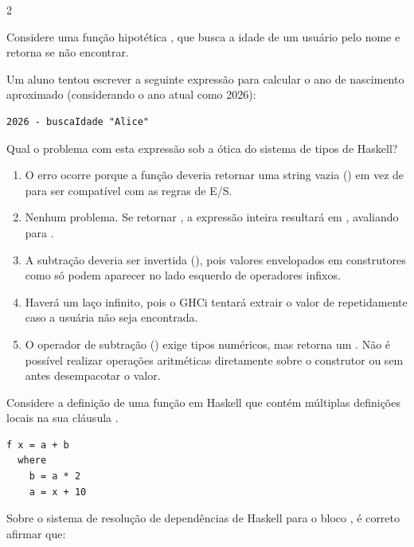 \documentclass[a4paper,10pt,brazil]{article}
\begin{document}
\begin{multicols}{2}
\begin{enumerate}
\end{enumerate}

Considere uma função hipotética , que busca a idade de um usuário pelo nome e retorna  se não encontrar. 

Um aluno tentou escrever a seguinte expressão para calcular o ano de nascimento aproximado (considerando o ano atual como 2026):
\begin{verbatim}
2026 - buscaIdade "Alice"
\end{verbatim}

Qual o problema com esta expressão sob a ótica do sistema de tipos de Haskell?

\begin{enumerate}
  \item O erro ocorre porque a função  deveria retornar uma string vazia () em vez de  para ser compatível com as regras de E/S.

  \item Nenhum problema. Se  retornar , a expressão inteira resultará em , avaliando para .

  \item A subtração deveria ser invertida (), pois valores envelopados em construtores como  só podem aparecer no lado esquerdo de operadores infixos.

  \item Haverá um laço infinito, pois o GHCi tentará extrair o valor de  repetidamente caso a usuária não seja encontrada.

  \item O operador de subtração (\haskellinline{-}) exige tipos numéricos, mas  retorna um . Não é possível realizar operações aritméticas diretamente sobre o construtor  ou  sem antes desempacotar o valor.


\end{enumerate}

Considere a definição de uma função  em Haskell que contém múltiplas definições locais na sua cláusula . 
\begin{verbatim}
f x = a + b
  where
    b = a * 2
    a = x + 10
\end{verbatim}
Sobre o sistema de resolução de dependências de Haskell para o bloco , é correto afirmar que:


\end{multicols}
\end{document}
